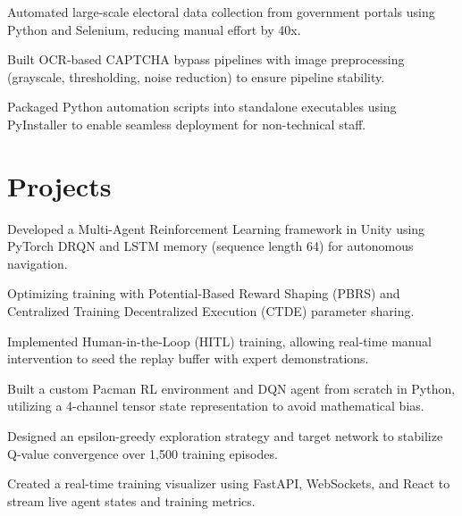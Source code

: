 \documentclass[]{plushcv}
\begin{document}
\begin{minipage}[t]{0.68\textwidth}
\begin{tightemize}
\item Automated large-scale electoral data collection from government portals using Python and Selenium, reducing manual effort by 40x.
\item Built OCR-based CAPTCHA bypass pipelines with image preprocessing (grayscale, thresholding, noise reduction) to ensure pipeline stability.
\item Packaged Python automation scripts into standalone executables using PyInstaller to enable seamless deployment for non-technical staff.
\end{tightemize}
\sectionsep



\section{Projects}

\begin{tightemize}
\item Developed a Multi-Agent Reinforcement Learning framework in Unity using PyTorch DRQN and LSTM memory (sequence length 64) for autonomous navigation.
\item Optimizing training with Potential-Based Reward Shaping (PBRS) and Centralized Training Decentralized Execution (CTDE) parameter sharing.
\item Implemented Human-in-the-Loop (HITL) training, allowing real-time manual intervention to seed the replay buffer with expert demonstrations.
\end{tightemize}
\sectionsep

\begin{tightemize}
\item Built a custom Pacman RL environment and DQN agent from scratch in Python, utilizing a 4-channel tensor state representation to avoid mathematical bias.
\item Designed an epsilon-greedy exploration strategy and target network to stabilize Q-value convergence over 1,500 training episodes.
\item Created a real-time training visualizer using FastAPI, WebSockets, and React to stream live agent states and training metrics.
\end{tightemize}
\sectionsep


\end{minipage}
\end{document}
